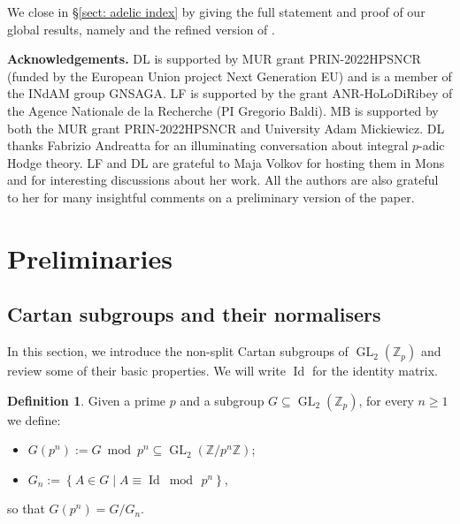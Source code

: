 \documentclass{amsart}
\newcommand{\op}[1]{\operatorname{#1}}
\theoremstyle{definition}
\newtheorem{definition}[theorem]{Definition}
\newcommand{\Z}{\mathbb{Z}}
\newcommand{\GL}{\operatorname{GL}}
\numberwithin{theorem}{section}
\numberwithin{equation}{section}
\begin{document}
We close in \S\ref{sect: adelic index} by giving the full statement and proof of our global results, namely  and the refined version of . 

\vspace{5pt}
\noindent \textbf{Acknowledgements.}
DL is supported by MUR grant PRIN-2022HPSNCR (funded by the European Union project Next Generation EU) and is a member of the INdAM group GNSAGA. LF is supported by the grant ANR-HoLoDiRibey of the Agence Nationale de la Recherche (PI Gregorio Baldi). MB is supported by both the MUR grant PRIN-2022HPSNCR and University Adam Mickiewicz. DL thanks Fabrizio Andreatta for an illuminating conversation about integral $p$-adic Hodge theory. LF and DL are grateful to Maja Volkov for hosting them in Mons and for interesting discussions about her work. All the authors are also grateful to her for many insightful comments on a preliminary version of the paper.


\section{Preliminaries}\label{sect: Prelims}

\subsection{Cartan subgroups and their normalisers}

In this section, we introduce the non-split Cartan subgroups of $\GL_2(\Z_p)$ and review some of their basic properties. We will write $\op{Id}$ for the identity matrix.

\begin{definition}
	Given a prime $p$ and a subgroup $G \subseteq \GL_2(\Z_p)$, for every $n \ge 1$ we define:
	\begin{itemize}
		\item $G(p^n):= G \bmod {p^n} \subseteq \GL_2\left({\Z}/{p^n\Z}\right)$;
		\item $G_n := \left\lbrace A \in G \mid A \equiv \op{Id} \bmod{\, p^n} \right\rbrace$,
	\end{itemize}
    so that $G(p^n)=G/G_n$.
\end{definition}
\end{document}
